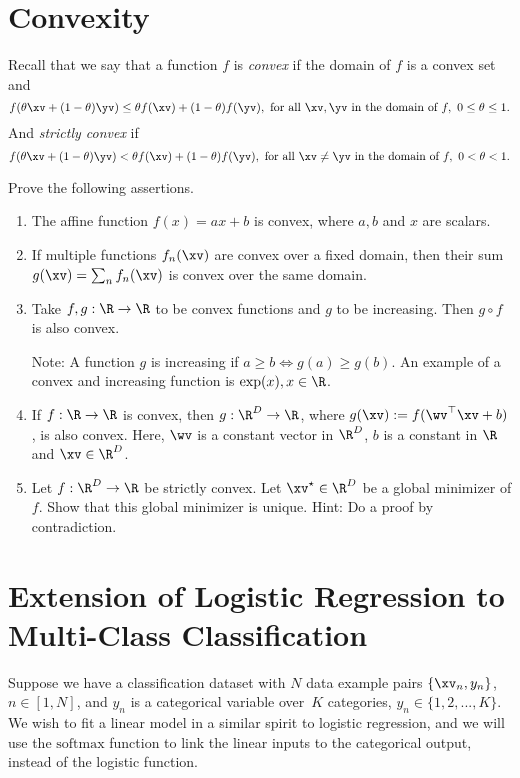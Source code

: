 \documentclass{../tex_import/ETHuebung_english}
\begin{document}

\section{Convexity} %

Recall that we say that a function $f$ is \emph{convex} if the domain of $f$ is a convex set and
\[	f(\theta \xv + (1 - \theta) \yv) \leq \theta f(\xv) + (1 - \theta) f(\yv), \text{ for all } \xv,\yv \text{ in the domain of } f,\ 0 \leq \theta \leq 1.	\]
And \emph{strictly convex} if
\[	f(\theta \xv + (1 - \theta) \yv) < \theta f(\xv) + (1 - \theta) f(\yv), \text{ for all } \xv\ne\yv \text{ in the domain of } f,\ 0 < \theta < 1.	\]

Prove the following assertions.
\begin{enumerate}
	\item The affine function $f(x) = ax + b$ is convex, where $a, b$ and $x$ are scalars.

	\item If multiple functions $f_n(\xv)$ are convex over a fixed domain, then their sum $g(\xv) = \sum_n f_n(\xv)$ is convex over the same domain.

	\item Take $f, g: \R \rightarrow \R$ to be convex functions and $g$ to be increasing. Then $g \circ f$ is also convex.

	Note: A function $g$ is increasing if $a \geq b \Leftrightarrow g(a) \geq g(b)$. An example of a convex and increasing function is $\exp(x), x \in \R$.

	\item If $f : \R \rightarrow \R$ is convex, then $g : \R^D \rightarrow \R$, where $g(\xv) := f(\wv^\top\xv + b)$, is also convex. Here, $\wv$ is a constant vector in $\R^D$, $b$ is a constant in $\R$ and $\xv \in \R^D$.

	\item Let $f : \R^D \rightarrow \R$ be strictly convex. Let $\xv^\star \in \R^D$ be a global minimizer of $f$. Show that this global minimizer is unique.
	Hint: Do a proof by contradiction.
\end{enumerate}



\section{Extension of Logistic Regression to Multi-Class Classification}
Suppose we have a classification dataset with $N$ data example pairs $\{\xv_n, y_n\}$, $n \in [1, N]$, and $y_n$ is a categorical variable over~$K$ categories, $y_n \in \{1, 2, ..., K\}$. We wish to fit a linear model in a similar spirit to logistic regression, and we will use the $\text{softmax}$ function to link the linear inputs to the categorical output, instead of the logistic function.
\end{document}

